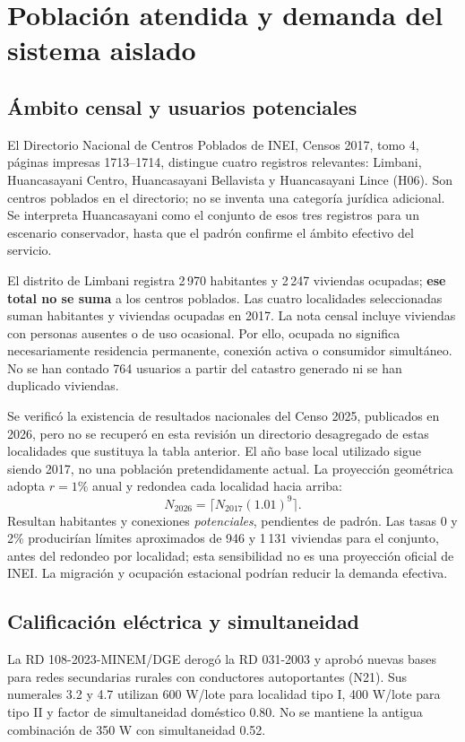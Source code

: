 \chapter{Población atendida y demanda del sistema aislado}
\section{Ámbito censal y usuarios potenciales}
El Directorio Nacional de Centros Poblados de INEI, Censos 2017, tomo 4, páginas impresas 1713--1714, distingue cuatro registros relevantes: Limbani, Huancasayani Centro, Huancasayani Bellavista y Huancasayani Lince (H06). Son centros poblados en el directorio; no se inventa una categoría jurídica adicional. Se interpreta Huancasayani como el conjunto de esos tres registros para un escenario conservador, hasta que el padrón confirme el ámbito efectivo del servicio.

El distrito de Limbani registra 2\,970 habitantes y 2\,247 viviendas ocupadas; \textbf{ese total no se suma} a los centros poblados. Las cuatro localidades seleccionadas suman  habitantes y  viviendas ocupadas en 2017. La nota censal incluye viviendas con personas ausentes o de uso ocasional. Por ello, ocupada no significa necesariamente residencia permanente, conexión activa o consumidor simultáneo. No se han contado 764 usuarios a partir del catastro generado ni se han duplicado viviendas.

Se verificó la existencia de resultados nacionales del Censo 2025, publicados en 2026, pero no se recuperó en esta revisión un directorio desagregado de estas localidades que sustituya la tabla anterior. El año base local utilizado sigue siendo 2017, no una población pretendidamente actual. La proyección geométrica adopta \(r=1\%\) anual y redondea cada localidad hacia arriba:
\begin{equation}N_{2026}=\lceil N_{2017}(1.01)^9\rceil.\end{equation}
Resultan  habitantes y  conexiones \emph{potenciales}, pendientes de padrón. Las tasas 0 y 2\% producirían límites aproximados de 946 y 1\,131 viviendas para el conjunto, antes del redondeo por localidad; esta sensibilidad no es una proyección oficial de INEI. La migración y ocupación estacional podrían reducir la demanda efectiva.

\section{Calificación eléctrica y simultaneidad}
La RD 108-2023-MINEM/DGE derogó la RD 031-2003 y aprobó nuevas bases para redes secundarias rurales con conductores autoportantes (N21). Sus numerales 3.2 y 4.7 utilizan 600 W/lote para localidad tipo I, 400 W/lote para tipo II y factor de simultaneidad doméstico 0.80. No se mantiene la antigua combinación de 350 W con simultaneidad 0.52.

